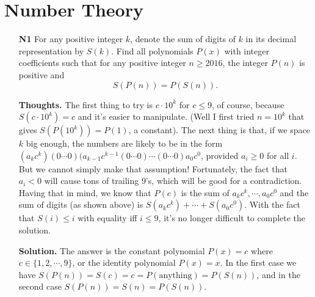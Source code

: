 \documentclass[11pt,a4paper]{article}
\begin{document}
\newpage 
\section{Number Theory}
\begin{itemize}
\item[\textbf{N1}]
For any positive integer $k$, denote the sum of digits of $k$ in its decimal representation by $S(k)$. Find all polynomials $P(x)$ with integer coefficients such that for any positive integer $n \geq 2016$, the integer $P(n)$ is positive and $$S(P(n)) = P(S(n)).$$

\textbf{Thoughts.} 
The first thing to try is $c\cdot 10^k$ for $c\le 9$, of course, 
because $S(c\cdot 10^k)=c$ and it's easier to manipulate. 
(Well I first tried $n=10^k$ that gives $S(P(10^k))=P(1)$, a constant). 
The next thing is that, if we space $k$ big enough, the numbers are likely to be in the form 
$(a_kc^k)(0\cdots 0)(a_{k-1}c^{k-1}(0\cdots 0)\cdots (0\cdots 0)a_0c^0$, 
provided $a_i\ge 0$ for all $i$. 
But we cannot simply make that assumption! 
Fortunately, the fact that $a_i< 0$ will cause tons of trailing 9's, which will be good for a contradiction. 
Having that in mind, we know that $P(c)$ is the sum of $a_kc^k, \cdots , a_0c^0$ and the sum of digits (as shown above) is 
$S(a_kc^k)+\cdots +S(a_0c^0)$. 
With the fact that $S(i)\le i$ with equality iff $i\le 9$, it's no longer difficult to complete the solution. 

\textbf{Solution.} 
The answer is the constant polynomial $P(x)=c$ where $c\in\{1,2,\cdots ,9\}$, 
or the identity polynomial $P(x)=x$. In the first case we have $S(P(n))=S(c)=c=P(\text{anything})=P(S(n))$, 
and in the second case $S(P(n))=S(n)=P(S(n))$. 


\end{itemize}
\end{document}
